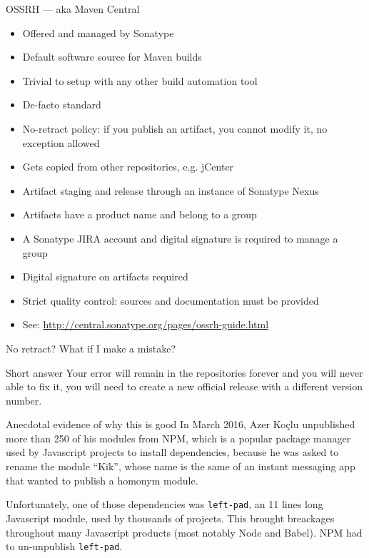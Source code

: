 \documentclass[presentation]{beamer}
\begin{document}
\begin{frame}[fragile]{OSSRH --- aka Maven Central}
	\begin{itemize}
		\item Offered and managed by Sonatype
		\item Default software source for Maven builds
		\item Trivial to setup with any other build automation tool
		\item De-facto standard
		\item No-retract policy: if you publish an artifact, you cannot modify it, no exception allowed
		\item Gets copied from other repositories, e.g. jCenter
		\item Artifact staging and release through an instance of Sonatype Nexus
		\item Artifacts have a product name and belong to a group
		\item A Sonatype JIRA account and digital signature is required to manage a group
		\item Digital signature on artifacts required
		\item Strict quality control: sources and documentation must be provided
		\item See: \url{http://central.sonatype.org/pages/ossrh-guide.html}
	\end{itemize}
\end{frame}

\begin{frame}[fragile]{No retract? What if I make a mistake?}
	\begin{block}{Short answer}
		Your error will remain in the repositories forever and you will never able to fix it, you will need to create a new official release with a different version number.
	\end{block}
	\begin{block}{Anecdotal evidence of why this is good}
		In March 2016, Azer Koçlu unpublished more than 250 of his modules from NPM, which is a popular package manager used by Javascript projects to install dependencies, because he was asked to rename the module ``Kik'', whose name is the same of an instant messaging app that wanted to publish a homonym module.
		
		Unfortunately, one of those dependencies was \texttt{left-pad}, an 11 lines long Javascript module, used by thousands of projects. This brought breackages throughout many Javascript products (most notably Node and Babel). NPM had to un-unpublish \texttt{left-pad}.
		
	\end{block}
\end{frame}
\end{document}
